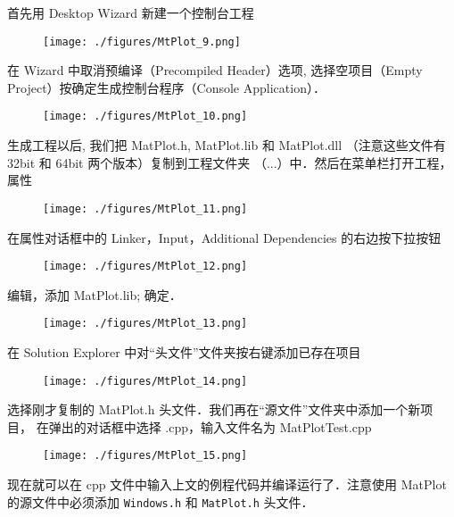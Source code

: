 首先用 Desktop Wizard 新建一个控制台工程
\begin{figure}[ht]
\centering
\texttt{[image: ./figures/MtPlot\_9.png]}
\caption{} \label{MtPlot_fig9}
\end{figure}

在 Wizard 中取消预编译（Precompiled Header）选项, 选择空项目（Empty Project）按确定生成控制台程序（Console Application）．

\begin{figure}[ht]
\centering
\texttt{[image: ./figures/MtPlot\_10.png]}
\caption{} \label{MtPlot_fig10}
\end{figure}

生成工程以后, 我们把 MatPlot.h, MatPlot.lib 和 MatPlot.dll （注意这些文件有 32bit 和 64bit 两个版本）复制到工程文件夹 （...\MatPlotTest\MatPlotTest）中．然后在菜单栏打开工程，属性

\begin{figure}[ht]
\centering
\texttt{[image: ./figures/MtPlot\_11.png]}
\caption{} \label{MtPlot_fig11}
\end{figure}

在属性对话框中的 Linker，Input，Additional Dependencies 的右边按下拉按钮

\begin{figure}[ht]
\centering
\texttt{[image: ./figures/MtPlot\_12.png]}
\caption{} \label{MtPlot_fig12}
\end{figure}

编辑，添加 MatPlot.lib; 确定．

\begin{figure}[ht]
\centering
\texttt{[image: ./figures/MtPlot\_13.png]}
\caption{} \label{MtPlot_fig13}
\end{figure}

在 Solution Explorer 中对“头文件”文件夹按右键添加已存在项目

\begin{figure}[ht]
\centering
\texttt{[image: ./figures/MtPlot\_14.png]}
\caption{} \label{MtPlot_fig14}
\end{figure}

选择刚才复制的 MatPlot.h 头文件．我们再在“源文件”文件夹中添加一个新项目， 在弹出的对话框中选择 .cpp，输入文件名为 MatPlotTest.cpp

\begin{figure}[ht]
\centering
\texttt{[image: ./figures/MtPlot\_15.png]}
\caption{} \label{MtPlot_fig15}
\end{figure}

现在就可以在 cpp 文件中输入上文的例程代码并编译运行了．注意使用 MatPlot 的源文件中必须添加 \verb|Windows.h| 和 \verb|MatPlot.h| 头文件．
